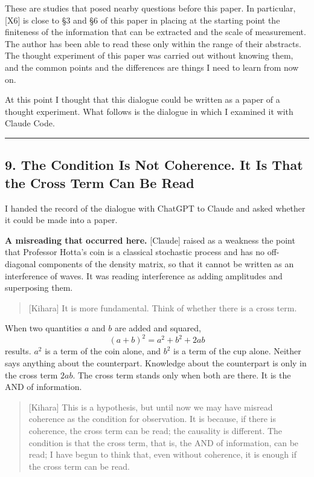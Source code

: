 \documentclass[
  a4paper,
]{article}
\begin{document}
These are studies that posed nearby questions before this paper. In
particular, {[}X6{]} is close to §3 and §6 of this paper in placing at
the starting point the finiteness of the information that can be
extracted and the scale of measurement. The author has been able to read
these only within the range of their abstracts. The thought experiment
of this paper was carried out without knowing them, and the common
points and the differences are things I need to learn from now on.

At this point I thought that this dialogue could be written as a paper
of a thought experiment. What follows is the dialogue in which I
examined it with Claude Code.

\begin{center}\rule{0.5\linewidth}{0.5pt}\end{center}

\subsection{9. The Condition Is Not Coherence. It Is That the Cross Term
Can Be
Read}\label{the-condition-is-not-coherence.-it-is-that-the-cross-term-can-be-read}

I handed the record of the dialogue with ChatGPT to Claude and asked
whether it could be made into a paper.

\textbf{A misreading that occurred here.} {[}Claude{]} raised as a
weakness the point that Professor Hotta's coin is a classical stochastic
process and has no off-diagonal components of the density matrix, so
that it cannot be written as an interference of waves. It was reading
interference as adding amplitudes and superposing them.

\begin{quote}
{[}Kihara{]} It is more fundamental. Think of whether there is a cross
term.
\end{quote}

When two quantities \(a\) and \(b\) are added and squared, \[
(a+b)^2 = a^2 + b^2 + 2ab \tag{9.1}
\] results. \(a^2\) is a term of the coin alone, and \(b^2\) is a term
of the cup alone. Neither says anything about the counterpart. Knowledge
about the counterpart is only in the cross term \(2ab\). The cross term
stands only when both are there. It is the AND of information.

\begin{quote}
{[}Kihara{]} This is a hypothesis, but until now we may have misread
coherence as the condition for observation. It is because, if there is
coherence, the cross term can be read; the causality is different. The
condition is that the cross term, that is, the AND of information, can
be read; I have begun to think that, even without coherence, it is
enough if the cross term can be read.
\end{quote}
\end{document}

